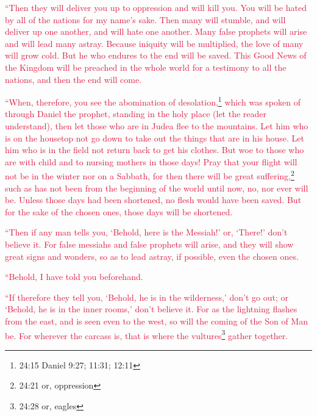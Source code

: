 \myverse{}\textcolor{crimson}{“Then they will deliver you up to oppression and will kill
	you. You will be hated by all of the nations for my name’s sake.
}
\myverse{}\textcolor{crimson}{Then many will stumble, and will deliver up one another, and will hate
	one another.
}
\myverse{}\textcolor{crimson}{Many false prophets will arise and will lead many astray.
}
\myverse{}\textcolor{crimson}{Because iniquity will be multiplied, the love of many will grow cold.
}
\myverse{}\textcolor{crimson}{But he who endures to the end will be saved.
}
\myverse{}\textcolor{crimson}{This Good News of the Kingdom will be preached in the whole world for
	a testimony to all the nations, and then the end will come.}

\myverse{}\textcolor{crimson}{“When, therefore, you see the abomination of desolation,}\footnote{24:15 Daniel 9:27;
	11:31;
	12:11}
\textcolor{crimson}{which was spoken of through Daniel the prophet, standing in the holy place (let the reader understand),
}
\myverse{}\textcolor{crimson}{then let those who are in Judea flee to the mountains.
}
\myverse{}\textcolor{crimson}{Let him who is on the housetop not go down to take out the things that
	are in his house.
}
\myverse{}\textcolor{crimson}{Let him who is in the field not return back to get his clothes.
}
\myverse{}\textcolor{crimson}{But woe to those who are with child and to nursing mothers in those days!
}
\myverse{}\textcolor{crimson}{Pray that your flight will not be in the winter nor on a Sabbath,
}
\myverse{}\textcolor{crimson}{for then there will be great suffering,}\footnote{24:21 or, oppression}
\textcolor{crimson}{such as has not been from the beginning of the world until now, no, nor ever will be.
}
\myverse{}\textcolor{crimson}{Unless those days had been shortened, no flesh would have been saved.
	But for the sake of the chosen ones, those days will be shortened.
}

\myverse{}\textcolor{crimson}{“Then if any man tells you, ‘Behold, here is the Messiah!’
	or, ‘There!’ don’t believe it.
}
\myverse{}\textcolor{crimson}{For false messiahs and false prophets will arise, and they will show
	great signs and wonders, so as to lead astray, if possible, even the chosen ones.}

\myverse{}\textcolor{crimson}{“Behold, I have told you beforehand.
}

\myverse{}\textcolor{crimson}{“If therefore they tell you, ‘Behold, he is in the wilderness,’
	don’t go out; or ‘Behold, he is in the inner rooms,’ don’t believe it.
}
\myverse{}\textcolor{crimson}{For as the lightning flashes from the east, and is seen even to the west,
	so will the coming of the Son of Man be.
}
\myverse{}\textcolor{crimson}{For wherever the carcass is, that is where the vultures}\footnote{24:28 or, eagles}
\textcolor{crimson}{gather together.
}

